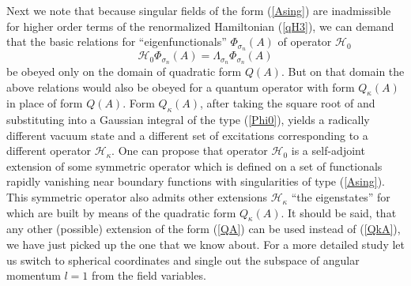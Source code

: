 \documentclass[12pt]{article}
\newcommand{\HH}{\mathscr{H}}
\begin{document}
	Next we note that
	because singular fields of the form
(\ref{Asing})
	are inadmissible for higher order terms of the renormalized Hamiltonian
(\ref{qH3}),
    we can demand that the basic relations for
    ``eigenfunctionals''
$ \Phi_{\sigma_{n}}(A) $
	of operator
$ \HH_{0} $
\begin{equation*}
    \HH_{0} \Phi_{\sigma_{n}}(A) = \Lambda_{\sigma_{n}} \Phi_{\sigma_{n}}(A)
\end{equation*}
	be obeyed only on the domain of quadratic form
$ Q(A) $.
	But on that domain the above relations would also be obeyed
	for a quantum operator with form
$ Q_{\kappa}(A) $
	in place of form
$ Q(A) $.
	Form
$ Q_{\kappa}(A) $,
	after taking the square root of and substituting into a Gaussian integral
	of the type 
(\ref{Phi0}),
	yields a radically different vacuum state and a different set of
	excitations corresponding to a different operator
$ \HH_{\kappa} $.
	One can propose that operator
$ \HH_{0} $
	is a self-adjoint extension of some symmetric operator
	which is defined on a set of functionals rapidly vanishing near
	boundary functions with singularities of type
(\ref{Asing}).
	This symmetric operator also admits other extensions 
$ \HH_{\kappa} $
	``the eigenstates'' for which are built by means of the quadratic form
$ Q_{\kappa}(A) $.
    It should be said, that any other (possible) extension of the form
(\ref{QA})
    can be used instead of
(\ref{QkA}),
    we have just picked up the one that we know about.
    For a more detailed study let us switch to spherical coordinates
    and single out the subspace of angular momentum
$ l=1 $
    from the field variables.



\end{document}
